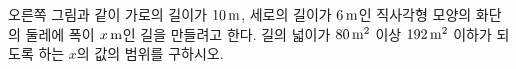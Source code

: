 \noindent\begin{minipage}[t]{0.58\linewidth}\vspace{0pt}\raggedright 오른쪽 그림과 같이 가로의 길이가 $10\mkern3mu \mathrm{m}$, 세로의 길이가 $6\mkern3mu \mathrm{m}$인 직사각형 모양의 화단의 둘레에 폭이 $x\mkern3mu \mathrm{m}$인 길을 만들려고 한다. 길의 넓이가 $80\mkern3mu \mathrm{m}^2$ 이상 $192\mkern3mu \mathrm{m}^2$ 이하가 되도록 하는 $x$의 값의 범위를 구하시오.\end{minipage}\hfill\begin{minipage}[t]{0.4\linewidth}\vspace{0pt}\centering \resizebox{\ifdim\width>\linewidth\linewidth\else\width\fi}{!}{}\end{minipage}\par
